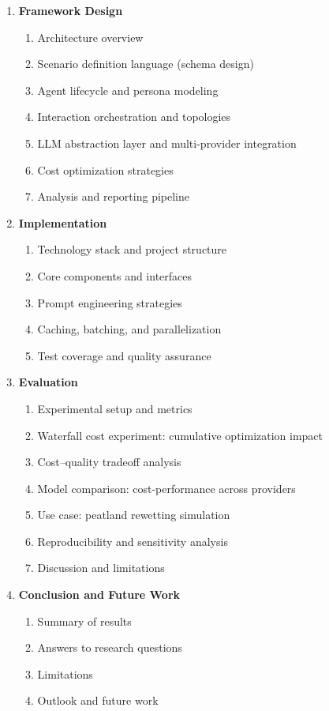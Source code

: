 \documentclass[12pt, a4paper]{article}
\begin{document}
\begin{enumerate}
    \item \textbf{Framework Design}
    \begin{enumerate}[label=\arabic{enumi}.\arabic*]
        \item Architecture overview
        \item Scenario definition language (schema design)
        \item Agent lifecycle and persona modeling
        \item Interaction orchestration and topologies
        \item LLM abstraction layer and multi-provider integration
        \item Cost optimization strategies
        \item Analysis and reporting pipeline
    \end{enumerate}

    \item \textbf{Implementation}
    \begin{enumerate}[label=\arabic{enumi}.\arabic*]
        \item Technology stack and project structure
        \item Core components and interfaces
        \item Prompt engineering strategies
        \item Caching, batching, and parallelization
        \item Test coverage and quality assurance
    \end{enumerate}

    \item \textbf{Evaluation}
    \begin{enumerate}[label=\arabic{enumi}.\arabic*]
        \item Experimental setup and metrics
        \item Waterfall cost experiment: cumulative optimization impact
        \item Cost--quality tradeoff analysis
        \item Model comparison: cost-performance across providers
        \item Use case: peatland rewetting simulation
        \item Reproducibility and sensitivity analysis
        \item Discussion and limitations
    \end{enumerate}

    \item \textbf{Conclusion and Future Work}
    \begin{enumerate}[label=\arabic{enumi}.\arabic*]
        \item Summary of results
        \item Answers to research questions
        \item Limitations
        \item Outlook and future work
    \end{enumerate}
\end{enumerate}
\end{document}
